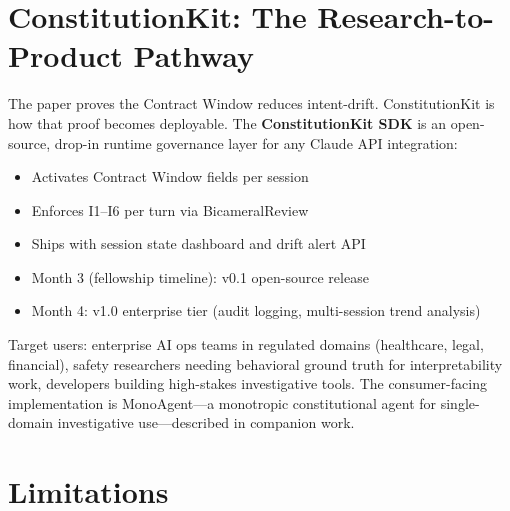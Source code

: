 \documentclass{article}
\newcommand{\cw}{Contract Window\xspace}
\begin{document}
\section{ConstitutionKit: The Research-to-Product Pathway}
\label{sec:ck}

The paper proves the \cw{} reduces intent-drift. ConstitutionKit is how that
proof becomes deployable. The \textbf{ConstitutionKit SDK} is an open-source,
drop-in runtime governance layer for any Claude API integration:

\begin{itemize}
\item Activates \cw{} fields per session
\item Enforces I1--I6 per turn via BicameralReview
\item Ships with session state dashboard and drift alert API
\item Month 3 (fellowship timeline): v0.1 open-source release
\item Month 4: v1.0 enterprise tier (audit logging, multi-session trend
analysis)
\end{itemize}

Target users: enterprise AI ops teams in regulated domains (healthcare, legal,
financial), safety researchers needing behavioral ground truth for
interpretability work, developers building high-stakes investigative tools.
The consumer-facing implementation is MonoAgent---a monotropic constitutional
agent for single-domain investigative use---described in companion work.

\section{Limitations}
\label{sec:limitations}
\end{document}
